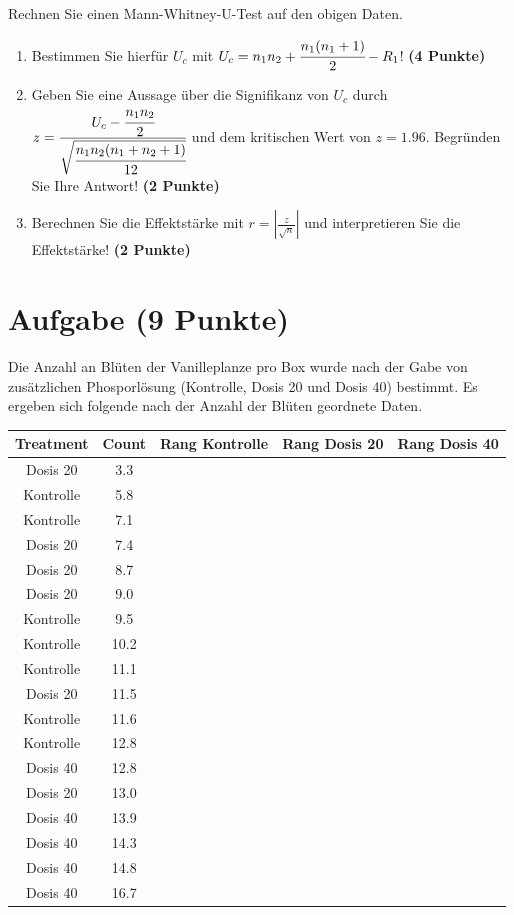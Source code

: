 \documentclass[a4paper, 10pt]{scrartcl}\usepackage[]{graphicx}\usepackage[]{xcolor}
\newenvironment{knitrout}{}{} %
\begin{document}
Rechnen Sie einen Mann-Whitney-U-Test auf den obigen Daten.

\begin{enumerate}
\item Bestimmen Sie hierf{\"u}r $U_c$ mit $U_c = n_1n_2 +
  \cfrac{n_1(n_1+1)}{2}-R_1$! \textbf{(4 Punkte)} 
\item Geben Sie eine Aussage {\"u}ber die Signifikanz von $U_c$ durch $z =
  \cfrac{U_c - \cfrac{n_1n_2}{2}}{\sqrt{\cfrac{n_1n_2(n_1+n_2+1)}{12}}}$ und
  dem kritischen Wert von $z = 1.96$. Begr{\"u}nden Sie Ihre Antwort! \textbf{(2 Punkte)} 
\item Berechnen Sie die Effektst{\"a}rke mit $r = |\frac{z}{\sqrt{n}}| $ und
  interpretieren Sie die Effektst{\"a}rke! \textbf{(2 Punkte)} 
\end{enumerate} 
\clearpage

\section{Aufgabe \hfill (9 Punkte)}



Die Anzahl an Bl{\"u}ten der Vanilleplanze pro Box wurde nach der Gabe von
zus{\"a}tzlichen Phosporl{\"o}sung (Kontrolle, Dosis 20 und Dosis 40) bestimmt. Es
ergeben sich folgende nach der Anzahl der Bl{\"u}ten geordnete Daten.

\begin{knitrout}
\color{fgcolor}\begin{table}[!h]
\centering
\begin{tabular}{ccccc}
\toprule
Treatment & Count & Rang Kontrolle & Rang Dosis 20 & Rang Dosis 40\\
\midrule
Dosis 20 & 3.3 &  &  & \\
Kontrolle & 5.8 &  &  & \\
Kontrolle & 7.1 &  &  & \\
Dosis 20 & 7.4 &  &  & \\
Dosis 20 & 8.7 &  &  & \\
\addlinespace
Dosis 20 & 9.0 &  &  & \\
Kontrolle & 9.5 &  &  & \\
Kontrolle & 10.2 &  &  & \\
Kontrolle & 11.1 &  &  & \\
Dosis 20 & 11.5 &  &  & \\
\addlinespace
Kontrolle & 11.6 &  &  & \\
Kontrolle & 12.8 &  &  & \\
Dosis 40 & 12.8 &  &  & \\
Dosis 20 & 13.0 &  &  & \\
Dosis 40 & 13.9 &  &  & \\
\addlinespace
Dosis 40 & 14.3 &  &  & \\
Dosis 40 & 14.8 &  &  & \\
Dosis 40 & 16.7 &  &  & \\
\bottomrule
\end{tabular}
\end{table}

\end{knitrout}
\end{document}
